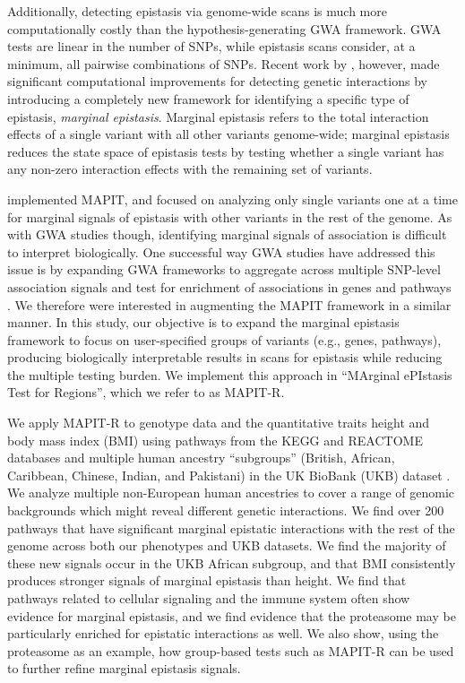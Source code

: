 \documentclass[12pt,a4paper]{article}
\begin{document}
Additionally, detecting epistasis via genome-wide scans is much more computationally costly than the hypothesis-generating GWA framework. GWA tests are linear in the number of SNPs, while epistasis scans consider, at a minimum, all pairwise combinations of SNPs. Recent work by \citet{Crawford2017a}, however, made significant computational improvements for detecting genetic interactions by introducing a completely new framework for identifying a specific type of epistasis, \textit{marginal epistasis}. %
Marginal epistasis refers to the total interaction effects of a single variant with all other variants genome-wide; marginal epistasis reduces the state space of epistasis tests by testing whether a single variant has any non-zero interaction effects with the remaining set of variants. 

\citet{Crawford2017a} implemented MAPIT, and focused on analyzing only single variants one at a time for marginal signals of epistasis with other variants in the rest of the genome. As with GWA studies though, identifying marginal signals of association is difficult to interpret biologically. One successful way GWA studies have addressed this issue is by expanding GWA frameworks to aggregate across multiple SNP-level association signals and test for enrichment of associations in genes and pathways \citep{Subramanian2005,Cantor2010,Wang2010,Lee2012,Carbonetto2013,Mooney2014,Gamazon2015,de2016,Nakka2016,Zhu2018,Cheng2019,Sun2019}. We therefore were interested in augmenting the MAPIT framework in a similar manner. In this study, our objective is to expand the marginal epistasis framework to focus on user-specified groups of variants (e.g., genes, pathways), producing biologically interpretable results in scans for epistasis while reducing the multiple testing burden. We implement this approach in ``MArginal ePIstasis Test for Regions'', which we refer to as MAPIT-R.

We apply MAPIT-R to genotype data and the quantitative traits height and body mass index (BMI) using pathways from the KEGG and REACTOME databases \citep{Liberzon2011} and multiple human ancestry ``subgroups'' (British, African, Caribbean, Chinese, Indian, and Pakistani)  in the UK BioBank (UKB) dataset \citep{Sudlow2015}. We analyze multiple non-European human ancestries to cover a range of genomic backgrounds which might reveal different genetic interactions. We find over 200 pathways that have significant marginal epistatic interactions with the rest of the genome across both our phenotypes and UKB datasets. We find the majority of these new signals occur in the UKB African subgroup, and that BMI consistently produces stronger signals of marginal epistasis than height. We find that pathways related to cellular signaling and the immune system often show evidence for marginal epistasis, and we find evidence that the proteasome may be particularly enriched for epistatic interactions as well. We also show, using the proteasome as an example, how group-based tests such as MAPIT-R can be used to further refine marginal epistasis signals.   
\end{document}

